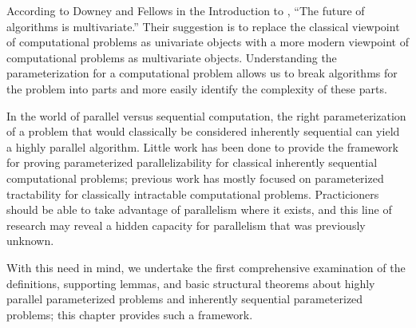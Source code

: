%
%
%
According to Downey and Fellows in the Introduction to \autocite{df13}, ``The future of algorithms is multivariate.''
Their suggestion is to replace the classical viewpoint of computational problems as univariate objects with a more modern viewpoint of computational problems as multivariate objects.
Understanding the parameterization for a computational problem allows us to break algorithms for the problem into parts and more easily identify the complexity of these parts.

%
%
%
In the world of parallel versus sequential computation, the right parameterization of a problem that would classically be considered inherently sequential can yield a highly parallel algorithm.
Little work has been done to provide the framework for proving parameterized parallelizability for classical inherently sequential computational problems; previous work has mostly focused on parameterized tractability for classically intractable computational problems.
Practicioners should be able to take advantage of parallelism where it exists, and this line of research may reveal a hidden capacity for parallelism that was previously unknown.

%
%
%
With this need in mind, we undertake the first comprehensive examination of the definitions, supporting lemmas, and basic structural theorems about highly parallel parameterized problems and inherently sequential parameterized problems;
%
%
%
this chapter provides such a framework.

